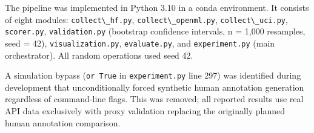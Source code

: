 The pipeline was implemented in Python 3.10 in a conda environment. It consists of eight modules: \texttt{collect\textbackslash \_hf.py}, \texttt{collect\textbackslash \_openml.py}, \texttt{collect\textbackslash \_uci.py}, \texttt{scorer.py}, \texttt{validation.py} (bootstrap confidence intervals, n = 1,000 resamples, seed = 42), \texttt{visualization.py}, \texttt{evaluate.py}, and \texttt{experiment.py} (main orchestrator). All random operations used seed 42.

A simulation bypass (\texttt{or True} in \texttt{experiment.py} line 297) was identified during development that unconditionally forced synthetic human annotation generation regardless of command-line flags. This was removed; all reported results use real API data exclusively with proxy validation replacing the originally planned human annotation comparison.
